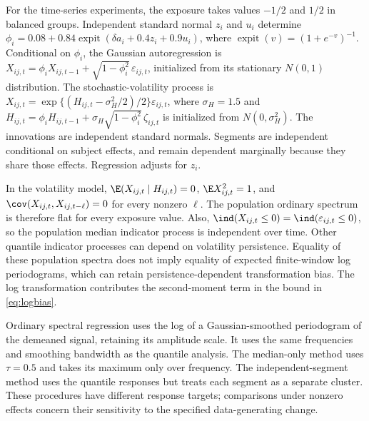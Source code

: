 For the time-series experiments, the exposure takes values $-1/2$ and $1/2$ in balanced groups. Independent standard normal $z_i$ and $u_i$ determine $\phi_i=0.08+0.84\operatorname{expit}(\delta a_i+0.4z_i+0.9u_i)$, where $\operatorname{expit}(v)=(1+e^{-v})^{-1}$. Conditional on $\phi_i$, the Gaussian autoregression is $X_{ij,t}=\phi_iX_{ij,t-1}+\sqrt{1-\phi_i^2}\,\varepsilon_{ij,t}$, initialized from its stationary $N(0,1)$ distribution. The stochastic-volatility process is $X_{ij,t}=\exp\{(H_{ij,t}-\sigma_H^2/2)/2\}\varepsilon_{ij,t}$, where $\sigma_H=1.5$ and $H_{ij,t}=\phi_i H_{ij,t-1}+\sigma_H\sqrt{1-\phi_i^2}\,\zeta_{ij,t}$ is initialized from $N(0,\sigma_H^2)$. The innovations are independent standard normals. Segments are independent conditional on subject effects, and remain dependent marginally because they share those effects. Regression adjusts for $z_i$.

In the volatility model, $\E(X_{ij,t}\mid H_{ij,t})=0$, $\E X_{ij,t}^2=1$, and $\cov(X_{ij,t},X_{ij,t-\ell})=0$ for every nonzero $\ell$. The population ordinary spectrum is therefore flat for every exposure value. Also, $\ind(X_{ij,t}\leq0)=\ind(\varepsilon_{ij,t}\leq0)$, so the population median indicator process is independent over time. Other quantile indicator processes can depend on volatility persistence. Equality of these population spectra does not imply equality of expected finite-window log periodograms, which can retain persistence-dependent transformation bias. The log transformation contributes the second-moment term in the bound in \eqref{eq:logbias}.

Ordinary spectral regression uses the log of a Gaussian-smoothed periodogram of the demeaned signal, retaining its amplitude scale. It uses the same frequencies and smoothing bandwidth as the quantile analysis. The median-only method uses $\tau=0.5$ and takes its maximum only over frequency. The independent-segment method uses the quantile responses but treats each segment as a separate cluster. These procedures have different response targets; comparisons under nonzero effects concern their sensitivity to the specified data-generating change.
